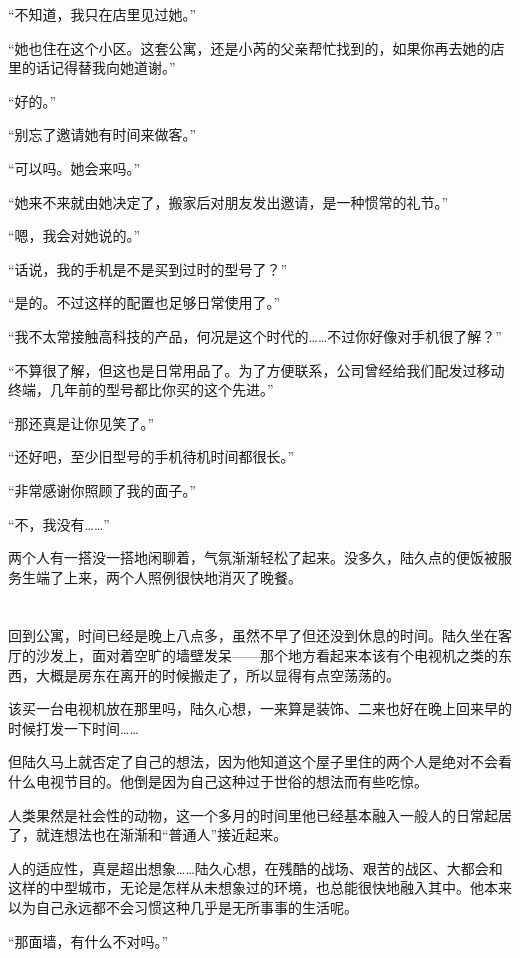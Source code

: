 “不知道，我只在店里见过她。”

“她也住在这个小区。这套公寓，还是小芮的父亲帮忙找到的，如果你再去她的店里的话记得替我向她道谢。”

“好的。”

“别忘了邀请她有时间来做客。”

“可以吗。她会来吗。”

“她来不来就由她决定了，搬家后对朋友发出邀请，是一种惯常的礼节。”

“嗯，我会对她说的。”

“话说，我的手机是不是买到过时的型号了？”

“是的。不过这样的配置也足够日常使用了。”

“我不太常接触高科技的产品，何况是这个时代的……不过你好像对手机很了解？”

“不算很了解，但这也是日常用品了。为了方便联系，公司曾经给我们配发过移动终端，几年前的型号都比你买的这个先进。”

“那还真是让你见笑了。”

“还好吧，至少旧型号的手机待机时间都很长。”

“非常感谢你照顾了我的面子。”

“不，我没有……”

两个人有一搭没一搭地闲聊着，气氛渐渐轻松了起来。没多久，陆久点的便饭被服务生端了上来，两个人照例很快地消灭了晚餐。

\section*{}

回到公寓，时间已经是晚上八点多，虽然不早了但还没到休息的时间。陆久坐在客厅的沙发上，面对着空旷的墙壁发呆——那个地方看起来本该有个电视机之类的东西，大概是房东在离开的时候搬走了，所以显得有点空荡荡的。

该买一台电视机放在那里吗，陆久心想，一来算是装饰、二来也好在晚上回来早的时候打发一下时间……

但陆久马上就否定了自己的想法，因为他知道这个屋子里住的两个人是绝对不会看什么电视节目的。他倒是因为自己这种过于世俗的想法而有些吃惊。

人类果然是社会性的动物，这一个多月的时间里他已经基本融入一般人的日常起居了，就连想法也在渐渐和“普通人”接近起来。

人的适应性，真是超出想象……陆久心想，在残酷的战场、艰苦的战区、大都会和这样的中型城市，无论是怎样从未想象过的环境，也总能很快地融入其中。他本来以为自己永远都不会习惯这种几乎是无所事事的生活呢。

“那面墙，有什么不对吗。”


